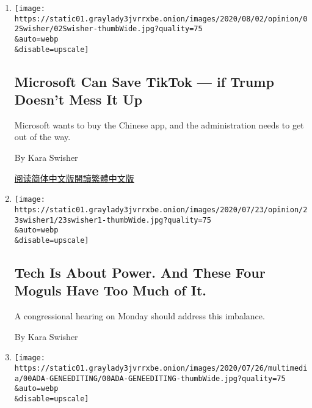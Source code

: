\begin{enumerate}
\def\labelenumi{\arabic{enumi}.}
\item
  \href{/2020/08/02/opinion/02tik-tok-china-trump.html}{}

  \texttt{[image: https://static01.graylady3jvrrxbe.onion/images/2020/08/02/opinion/02Swisher/02Swisher-thumbWide.jpg?quality=75\\\&auto=webp\\\&disable=upscale]}

  \hypertarget{microsoft-can-save-tiktok--if-trump-doesnt-mess-it-up}{%
  \subsection{Microsoft Can Save TikTok --- if Trump Doesn't Mess It
  Up}\label{microsoft-can-save-tiktok--if-trump-doesnt-mess-it-up}}

  Microsoft wants to buy the Chinese app, and the administration needs
  to get out of the way.

  By Kara Swisher

  \href{https://cn.nytimes3xbfgragh.onion/opinion/20200804/tik-tok-china-trump/}{阅读简体中文版}\href{https://cn.nytimes3xbfgragh.onion/opinion/20200804/tik-tok-china-trump/zh-hant/}{閱讀繁體中文版}
\item
  \href{/2020/07/23/opinion/tech-moguls-congressional-hearing.html}{}

  \texttt{[image: https://static01.graylady3jvrrxbe.onion/images/2020/07/23/opinion/23swisher1/23swisher1-thumbWide.jpg?quality=75\\\&auto=webp\\\&disable=upscale]}

  \hypertarget{tech-is-about-power-and-these-four-moguls-have-too-much-of-it}{%
  \subsection{Tech Is About Power. And These Four Moguls Have Too Much
  of
  It.}\label{tech-is-about-power-and-these-four-moguls-have-too-much-of-it}}

  A congressional hearing on Monday should address this imbalance.

  By Kara Swisher
\item
  \href{/2020/07/22/style/crispr-gene-editing-ethics.html}{}

  \texttt{[image: https://static01.graylady3jvrrxbe.onion/images/2020/07/26/multimedia/00ADA-GENEEDITING/00ADA-GENEEDITING-thumbWide.jpg?quality=75\\\&auto=webp\\\&disable=upscale]}

  \hypertarget{once-science-fiction-gene-editing-is-now-a-looming-reality}{%
}
\end{enumerate}
